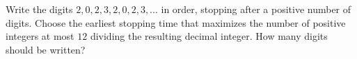 Write the digits $2,0,2,3,2,0,2,3,\ldots$ in order, stopping after a positive number of digits. Choose the earliest stopping time that maximizes the number of positive integers at most $12$ dividing the resulting decimal integer. How many digits should be written?
